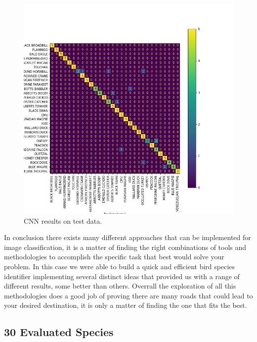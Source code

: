 \documentclass[11pt]{article}
\begin{document}
\begin{singlespace}
\begin{figure}[p]
    \centering
    \includegraphics[width=1\textwidth]{plots/deep-learn-cf_final.jpg}
    \caption{CNN results on test data.}
\end{figure}

\pagebreak

In conclusion there exists many different approaches that can be implemented for image classification, it is a matter of finding the right combinations of tools and methodologies to accomplish the specific task that best would solve your problem. In this case we were able to build a quick and efficient bird species identifier implementing several distinct ideas that provided us with a range of different results, some better than others. Overrall the exploration of all this methodologies does a good job of proving there are many roads that could lead to your desired destination, it is only a matter of finding the one that fits the best.


\begin{appendices}
\section{30 Evaluated Species}
\begin{figure}[h]
    \centering
    

\end{figure}
\end{appendices}
\end{singlespace}
\end{document}
